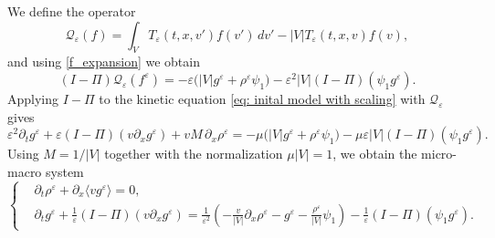 \documentclass[11pt,twoside]{article}
\numberwithin{equation}{section}
\theoremstyle{plain}
\theoremstyle{nonumberplain}
\begin{document}
{We define the operator
\[
\mathcal{Q}_\varepsilon(f)
=
\int_V T_\varepsilon(t,x,v')f(v')\,dv'
-
|V|T_\varepsilon(t,x,v)f(v),
\]
and using \eqref{f_expansion} we obtain
\[
(I-\Pi)\mathcal Q_\varepsilon(f^\varepsilon)
=
-\varepsilon\bigl(|V|g^\varepsilon+\rho^\varepsilon\psi_1\bigr)
-\varepsilon^2|V|(I-\Pi)(\psi_1g^\varepsilon).
\]
Applying \(I-\Pi\) {to the kinetic equation \eqref{eq: inital model with scaling}} with
\(\mathcal Q_\varepsilon\) gives
\[
\varepsilon^2 \partial_t g^\varepsilon
+
\varepsilon (I-\Pi)(v\partial_x g^\varepsilon)
+
vM\,\partial_x \rho^\varepsilon
=
-\mu\bigl(|V|g^\varepsilon+\rho^\varepsilon\psi_1\bigr)
-\mu\varepsilon |V|(I-\Pi)(\psi_1g^\varepsilon).
\]
Using \(M=1/|V|\) together with the normalization \(\mu |V|=1\), we obtain
the micro-macro system
\begin{equation}\label{eq:micro-macro-normalized}
\left\{
\begin{aligned}
&\partial_t \rho^\varepsilon
+\partial_x \langle v g^\varepsilon\rangle = 0,\\
&\partial_t g^\varepsilon
+\frac1\varepsilon (I-\Pi)(v\partial_x g^\varepsilon)
=
\frac1{\varepsilon^2}
\left(
-\frac{v}{|V|}\partial_x \rho^\varepsilon
-g^\varepsilon
-\frac{\rho^\varepsilon}{|V|}\psi_1
\right)
-\frac1\varepsilon (I-\Pi)(\psi_1g^\varepsilon).
\end{aligned}
\right.
\end{equation}

}
\end{document}
